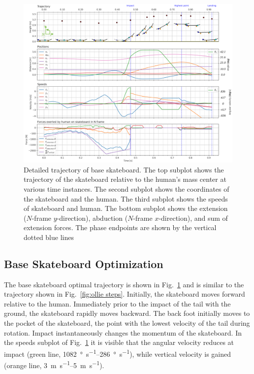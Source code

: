 \documentclass[default,iicol]{sn-jnl}
\begin{document}
\begin{figure}
    \centering
    \includegraphics[trim={0cm 0cm 0cm 0cm},clip,width=\textwidth]{paper/figure/Fig6.png}
    \caption[Trajectory, positions, speeds, and forces of base optimization]{Detailed trajectory of base skateboard. The top subplot shows the trajectory of the skateboard relative to the human's mass center at various time instances. The second subplot shows the coordinates of the skateboard and the human. The third subplot shows the speeds of skateboard and human. The bottom subplot shows the extension ($N$-frame $y$-direction), abduction ($N$-frame $x$-direction), and sum of extension forces. The phase endpoints are shown by the vertical dotted blue lines}\label{f_noparameter}
\end{figure}

\subsection{Base Skateboard Optimization}

The base skateboard optimal trajectory is shown in Fig.~\ref{f_noparameter} and is similar to the trajectory shown in Fig.~\ref{fig:ollie steps}.
Initially, the skateboard moves forward relative to the human. Immediately prior to the impact of the tail with the ground, the skateboard rapidly moves backward. 
The back foot initially moves to the pocket of the skateboard, the point with the lowest velocity of the tail during rotation.
Impact instantaneously changes the momentum of the skateboard.
In the speeds subplot of Fig.~\ref{f_noparameter} it is visible that the angular velocity reduces at impact (green line, \SIrange{1082}{286}{\degree\per\second}), while vertical velocity is gained (orange line, \SIrange{3}{5}{\meter\per\second}).
\end{document}
